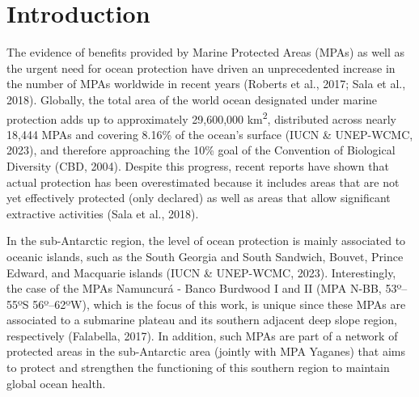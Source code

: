 \documentclass[preprint, 3p,
authoryear]{elsarticle} %
\begin{document}
\hypertarget{introduction}{%
\section{Introduction}\label{introduction}}

The evidence of benefits provided by Marine Protected Areas (MPAs) as
well as the urgent need for ocean protection have driven an
unprecedented increase in the number of MPAs worldwide in recent years
(Roberts et al., 2017; Sala et al., 2018). Globally, the total area of
the world ocean designated under marine protection adds up to
approximately 29,600,000 km\textsuperscript{2}, distributed across
nearly 18,444 MPAs and covering 8.16\% of the ocean's surface (IUCN \&
UNEP-WCMC, 2023), and therefore approaching the 10\% goal of the
Convention of Biological Diversity (CBD, 2004). Despite this progress,
recent reports have shown that actual protection has been overestimated
because it includes areas that are not yet effectively protected (only
declared) as well as areas that allow significant extractive activities
(Sala et al., 2018).

In the sub-Antarctic region, the level of ocean protection is mainly
associated to oceanic islands, such as the South Georgia and South
Sandwich, Bouvet, Prince Edward, and Macquarie islands (IUCN \&
UNEP-WCMC, 2023). Interestingly, the case of the MPAs Namuncurá - Banco
Burdwood I and II (MPA N-BB, 53º--55ºS 56º--62ºW), which is the focus of
this work, is unique since these MPAs are associated to a submarine
plateau and its southern adjacent deep slope region, respectively
(Falabella, 2017). In addition, such MPAs are part of a network of
protected areas in the sub-Antarctic area (jointly with MPA Yaganes)
that aims to protect and strengthen the functioning of this southern
region to maintain global ocean health.
\end{document}
